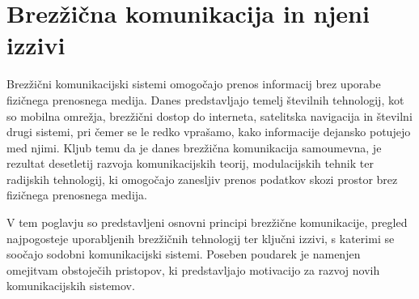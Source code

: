 \documentclass[a4paper, 12pt, openany]{book}
\begin{document}
\chapter{Brezžična komunikacija in njeni izzivi} %
\label{ch0}

Brezžični komunikacijski sistemi omogočajo prenos informacij brez uporabe fizičnega prenosnega medija. Danes predstavljajo temelj številnih tehnologij, kot so mobilna omrežja, brezžični dostop do interneta, satelitska navigacija in številni drugi sistemi, pri čemer se le redko vprašamo, kako informacije dejansko potujejo med njimi. Kljub temu da je danes brezžična komunikacija samoumevna, je rezultat desetletij razvoja komunikacijskih teorij, modulacijskih tehnik ter radijskih tehnologij, ki omogočajo zanesljiv prenos podatkov skozi prostor brez fizičnega prenosnega medija.

V tem poglavju so predstavljeni osnovni principi brezžične komunikacije, pregled najpogosteje uporabljenih brezžičnih tehnologij ter ključni izzivi, s katerimi se soočajo sodobni komunikacijski sistemi. Poseben poudarek je namenjen omejitvam obstoječih pristopov, ki predstavljajo motivacijo za razvoj novih komunikacijskih sistemov.
\end{document}
